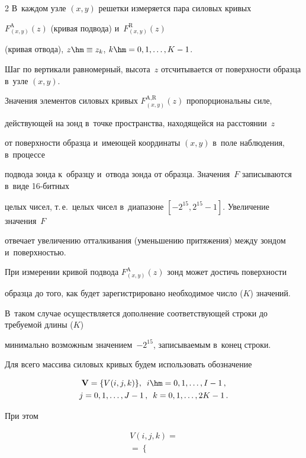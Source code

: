 \begin{multicols}{2}
В~каждом узле $(x,y)$ решетки измеряется пара силовых кривых 

$F^\text{A}_{(x,y)}(z)$ (кривая подвода) и~$F^\text{R}_{(x,y)}(z)$ 

(кривая отвода), $z\hm\equiv z_k$, $k\hm=0,1,\ldots,K-1$. 

Шаг по вертикали равномерный, высота~$z$ отсчитывается от поверхности образца в~узле $(x,y)$.



Значения элементов силовых кривых $F^\text{A,R}_{(x,y)}(z)$ пропорциональны силе, 

действующей на зонд в~точке пространства, находящейся на расстоянии~$z$ 

от поверхности образца и~имеющей координаты $(x,y)$ в~поле наблюдения, в~процессе 

подвода зонда к~образцу и~отвода зонда от образца. Значения~$F$ записываются в~виде 16-бит\-ных 

целых чисел, т.\,е.\ целых чисел в~диапазоне $[-2^{15},2^{15}-1]$. Увеличение значения~$F$ 

отвечает увеличению отталкивания (уменьшению притяжения) между зондом и~поверхностью. 

При измерении кривой подвода $F^\text{A}_{(x,y)}(z)$ зонд может достичь поверхности 

образца до того, как будет зарегистрировано необходимое число ($K$) значений.

 В~таком случае осуществляется дополнение соответствующей строки до требуемой длины ($K$) 

 минимально возможным значением~$-2^{15}$, записываемым в~конец строки.



Для всего массива силовых кривых будем использовать обозначение 

\begin{multline*}

\mathbf{V}=\{V(i,j,k)\},\enskip i\hm= 0,1,\dots,I-1\,,\\

j=0,1,\dots,J-1\,,\enskip

 k=0,1,\dots,2K-1\,. 

 \end{multline*}

При этом

\begin{multline*}

V(i,j,k) ={}\\

{}= \begin{cases}


\end{cases}
\end{multline*}
\end{multicols}
